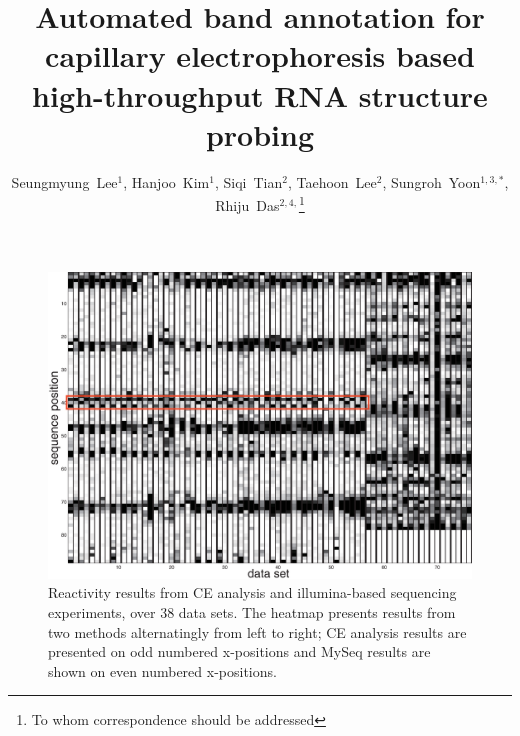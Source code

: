 \documentclass[letter]{bioinfo}
\begin{document}

\title[Automated band annotation for capillary electrophoresis]{Automated band annotation for capillary electrophoresis based high-throughput RNA structure probing}
\author[Lee \textit{et~al}]
{
Seungmyung~Lee$^{1}$,
Hanjoo~Kim$^{1}$,
Siqi~Tian$^{2}$,
Taehoon~Lee$^{2}$,
Sungroh~Yoon$^{1,3,*}$,
Rhiju~Das$^{2,4,}$\footnote{To whom correspondence should be addressed}
}
\address{
$^{1}$Department of ECE, Seoul National University, Seoul 151-744, Korea
$^{2}$Department of Biochemistry, Stanford University School of Medicine, Stanford, CA 94305, USA
$^{3}$Interdisciplinary Program in Bionformatics, Seoul National University, Seoul 151-744, Korea
$^{4}$Department of Physics, Stanford University, Stanford, CA 94305, USA
}

\history{}


\maketitle



\begin{figure}
\centering
\includegraphics[width=\linewidth]{figures/supp_eterna_comparison}
\caption{Reactivity results from CE analysis and illumina-based sequencing experiments, over 38 data sets. The heatmap presents results from two methods alternatingly from left to right; CE analysis results are presented on odd numbered x-positions and MySeq results are shown on even numbered x-positions.}
\label{f:eterna_comparison}
\end{figure}
\end{document}
